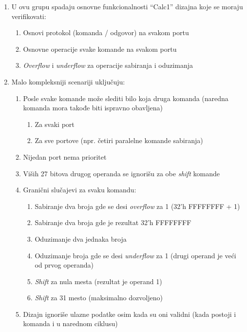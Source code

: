 \begin{enumerate}

\item U ovu grupu spadaju osnovne funkcionalnosti ``Calc1'' dizajna koje se
  moraju verifikovati:
  \begin{enumerate}
  \item Osnovi protokol (komanda / odgovor) na svakom portu
  \item Osnovne operacije svake komande na svakom portu
  \item \emph{Overflow} i \emph{underflow} za operacije sabiranja i oduzimanja
  \end{enumerate}

\item Malo kompleksniji scenariji uključuju:
  \begin{enumerate}

  \item Posle svake komande može slediti bilo koja druga komanda (naredna
    komanda mora takođe biti ispravno obavljena)
    \begin{enumerate}
    \item Za svaki port
    \item Za sve portove (npr. četiri paralelne komande sabiranja)
    \end{enumerate}

  \item Nijedan port nema prioritet

  \item Viših 27 bitova drugog operanda se ignorišu za obe \emph{shift} komande

  \item Granični slučajevi za svaku komandu:
    \begin{enumerate}
    \item Sabiranje dva broja gde se desi \emph{overflow} za 1 (32’h FFFFFFFF +
      1)
    \item Sabiranje dva broja gde je rezultat 32’h FFFFFFFF
    \item Oduzimanje dva jednaka broja
    \item Oduzimanje broja gde se desi \emph{underflow} za 1 (drugi operand je
      veći od prvog operanda)
    \item \emph{Shift} za nula mesta (rezultat je operand 1)
    \item \emph{Shift} za 31 mesto (maksimalno dozvoljeno)
    \end{enumerate}
    
  \item Dizajn ignoriše ulazne podatke osim kada su oni validni (kada postoji i
    komanda i u narednom ciklusu)
  \end{enumerate}


\end{enumerate}
